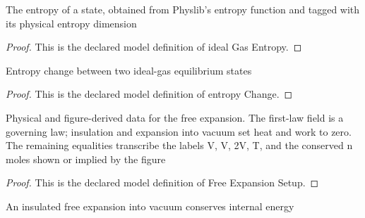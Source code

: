 \begin{definition}
  \label{def:physics:phyx-mini-0475:phyxmini0475-idealgasentropy}
  The entropy of a state, obtained from Physlib's entropy function and tagged with its physical entropy dimension
\end{definition}
\begin{proof}
  This is the declared model definition of ideal Gas Entropy.
\end{proof}
\begin{definition}
  \label{def:physics:phyx-mini-0475:phyxmini0475-entropychange}
  Entropy change between two ideal-gas equilibrium states
\end{definition}
\begin{proof}
  This is the declared model definition of entropy Change.
\end{proof}
\begin{definition}
  \label{def:physics:phyx-mini-0475:phyxmini0475-freeexpansionsetup}
  Physical and figure-derived data for the free expansion. The first-law field is a governing law; insulation and expansion into vacuum set heat and work to zero. The remaining equalities transcribe the labels V, V, 2V, T, and the conserved n moles shown or implied by the figure
\end{definition}
\begin{proof}
  This is the declared model definition of Free Expansion Setup.
\end{proof}
\begin{lemma}
  \label{lem:physics:phyx-mini-0475:phyxmini0475-internalenergy-conserved}
  An insulated free expansion into vacuum conserves internal energy
\end{lemma}
